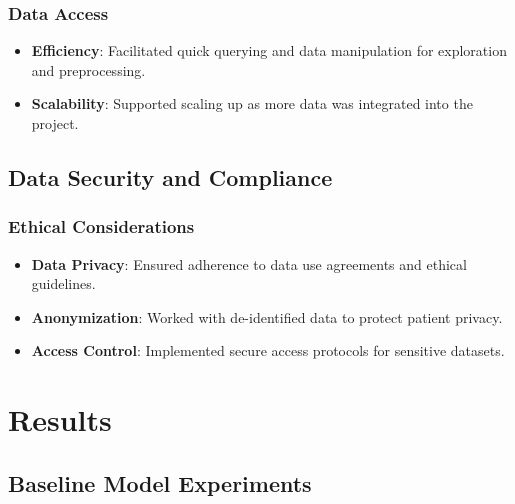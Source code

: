 \documentclass[12pt,a4paper]{report}
\begin{document}
\subsection{Data Access}
\begin{itemize}
    \item \textbf{Efficiency}: Facilitated quick querying and data manipulation for exploration and preprocessing.
    \item \textbf{Scalability}: Supported scaling up as more data was integrated into the project.
\end{itemize}

\section{Data Security and Compliance}

\subsection{Ethical Considerations}
\begin{itemize}
    \item \textbf{Data Privacy}: Ensured adherence to data use agreements and ethical guidelines.
    \item \textbf{Anonymization}: Worked with de-identified data to protect patient privacy.
    \item \textbf{Access Control}: Implemented secure access protocols for sensitive datasets.
\end{itemize}

\chapter{Results}

\section{Baseline Model Experiments}
\end{document}
